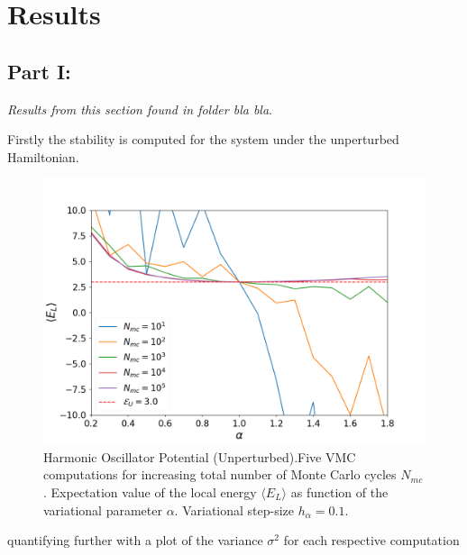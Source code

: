 \documentclass[aip,nobalancelastpage,
twocolumn,
rsi,%
 amsmath,amssymb,
 reprint,%
]{revtex4}
\begin{document}
\section{Results}
\subsection{Part I: }
\textit{Results from this section found in folder bla bla}.\par
Firstly the stability is computed for the system under the unperturbed Hamiltonian.

\begin{figure}[H]
\center
\includegraphics[scale=0.33]{figsPartI/IStabilityE.png}
\caption{Harmonic Oscillator Potential (Unperturbed).\newline Five VMC computations for increasing total number of Monte Carlo cycles $N_{mc}$. Expectation value of the local energy $\langle E_L \rangle$ as function of the variational parameter $\alpha$. Variational step-size $h_\alpha = 0.1$.}
\label{Ifig1}
\end{figure}
quantifying further with a plot of the variance $\sigma^2$ for each respective computation
\end{document}
